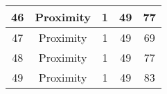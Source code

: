 \documentclass[results.tex]{subfiles}
\begin{document}
\begin{center}
\begin{tabular}{| c || c | c | c | c |}
            \hline
            46                      & Proximity                    & 1                      & 49                      & 77                   \\
            \hline
            47                      & Proximity                    & 1                      & 49                      & 69                   \\
            \hline
            48                      & Proximity                    & 1                      & 49                      & 77                   \\
            \hline
            49                      & Proximity                    & 1                      & 49                      & 83                   \\
            \hline
        \end{tabular}
    \end{center}
\end{document}
